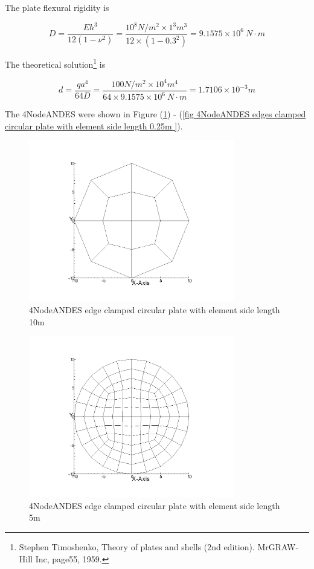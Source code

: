 \documentclass[fleqn,11pt,letter]{article}
\begin{document}
The plate flexural rigidity is 

\begin{equation}
  D=\frac{Eh^3}{12(1-\nu^2)}=\frac{10^8 N/m^2 \times 1^3 m^3 }{12 \times (1-0.3^2) }= 9.1575 \times 10^6 \ N\cdot m
\end{equation}

The theoretical solution\footnote{Stephen Timoshenko, Theory of plates and shells (2nd edition). MrGRAW-Hill Inc, page55, 1959.} is 

\begin{equation}
  d= \frac{q a^4}{64D}=\frac{100 N/m^2 \times 10^4 m^4}{64 \times 9.1575 \times 10^6 \ N\cdot m}=1.7106\times 10^{-3} m
\end{equation}

The 4NodeANDES were shown in Figure (\ref{fig 4NodeANDES edges clamped circular plate with element side length 10m }) - (\ref{fig 4NodeANDES edges clamped circular plate with element side length 0.25m }). 




\begin{figure}[H]
  \centering
  \includegraphics[width=9cm]{../Figure_files/4NodeANDES/circular_plate1.png}
  \caption{4NodeANDES edge clamped circular plate with element side length 10m }
  \label{fig 4NodeANDES edges clamped circular plate with element side length 10m }
\end{figure}

\newpage

\begin{figure}[H]
  \centering
  \includegraphics[width=9cm]{../Figure_files/4NodeANDES/circular_plate2.png}
  \caption{4NodeANDES edge clamped circular plate with element side length 5m }
  \label{fig 4NodeANDES edges clamped circular plate with element side length 5m }
\end{figure}
\end{document}
